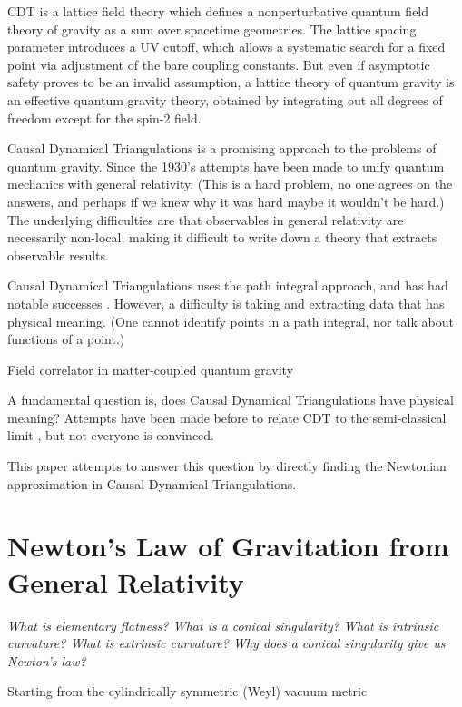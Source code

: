 \documentclass[12pt]{article}
\begin{document}
CDT is a lattice field theory which defines a nonperturbative quantum field theory of gravity as a sum over spacetime geometries. The lattice spacing parameter introduces a UV cutoff, which allows a systematic search for a fixed point via adjustment of the bare coupling constants. But even if asymptotic safety proves to be an invalid assumption, a lattice theory of quantum gravity is an effective quantum gravity theory, obtained by integrating out all degrees of freedom except for the spin-2 field. 

Causal Dynamical Triangulations \cite{ambjorn_geometry_1996,cdt,ambjorn_nonperturbative_2012} is a promising approach to the problems of quantum gravity. Since the 1930's \cite{rovelli_notes_2000} attempts have been made to unify quantum mechanics with general relativity. (This is a hard problem, no one agrees on the answers, and perhaps if we knew why it was hard maybe it wouldn't be hard.) The underlying difficulties are that observables in general relativity are necessarily non-local, making it difficult to write down a theory that extracts observable results.

Causal Dynamical Triangulations uses the path integral approach, and has had notable successes \cite{kommu_validation_2011}. However, a difficulty is taking and extracting data that has physical meaning. (One cannot identify points in a path integral, nor talk about functions of a point.)

Field correlator in matter-coupled quantum gravity

A fundamental question is, does Causal Dynamical Triangulations have physical meaning? Attempts have been made before to relate CDT to the semi-classical limit \cite{ambjorn_semiclassical_2011,ambjorn_semiclassical}, but not everyone is convinced.

This paper attempts to answer this question by directly finding the Newtonian approximation in Causal Dynamical Triangulations.

\section{Newton's Law of Gravitation from General Relativity}
\label{sec:newtons-law}

\textit{What is elementary flatness? What is a conical singularity? What is intrinsic curvature? What is extrinsic curvature? Why does a conical singularity give us Newton's law?}

Starting from the cylindrically symmetric (Weyl) vacuum metric \cite{synge_relativity}
\end{document}
